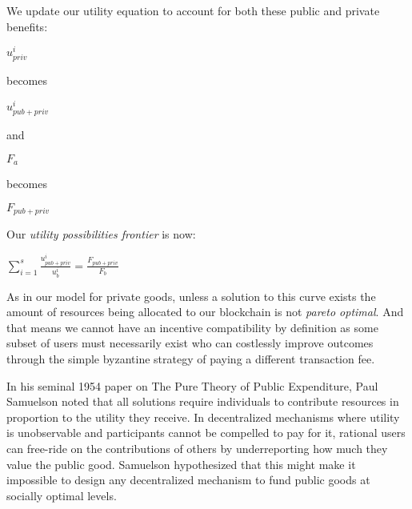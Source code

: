 \documentclass[oneside]{article}   	%
\begin{document}
We update our utility equation to account for both these public and private benefits:

\large
\begin{adjustwidth}{1.5em}{1.5em} 
\begin{math}
{u_{priv}^i}
\end{math}
\end{adjustwidth}
\normalsize

becomes

\large
\begin{adjustwidth}{1.5em}{1.5em} 
\begin{math}
{u_{{pub}+{priv}}^i}
\end{math}
\end{adjustwidth}
\normalsize

and

\large
\begin{adjustwidth}{1.5em}{1.5em} 
\begin{math}
{F_a}
\end{math}
\end{adjustwidth}
\normalsize

becomes

\large
\begin{adjustwidth}{1.5em}{1.5em} 
\begin{math}
{F_{{pub}+{priv}}}
\end{math}
\end{adjustwidth}
\normalsize

Our \textit{utility possibilities frontier} is now:

\LARGE
\begin{adjustwidth}{1.5em}{1.5em} 
\begin{math}
\sum_{i=1}^{s} \frac{u_{{pub}+{priv}}^i}{u_b^i} = \frac{F_{{pub}+{priv}}}{F_b}
\end{math}
\end{adjustwidth}
\normalsize

As in our model for private goods, unless a solution to this curve exists the amount of resources being allocated to our blockchain is not \textit{pareto optimal}. And that means we cannot have an incentive compatibility by definition as some subset of users must necessarily exist who can costlessly improve outcomes through the simple byzantine strategy of paying a different transaction fee.

In his seminal 1954 paper on The Pure Theory of Public Expenditure, Paul Samuelson noted that all solutions require individuals to contribute resources in proportion to the utility they receive. In decentralized mechanisms where utility is unobservable and participants cannot be compelled to pay for it, rational users can free-ride on the contributions of others by underreporting how much they value the public good. Samuelson hypothesized that this might make it impossible to design any decentralized mechanism to fund public goods at socially optimal levels.
\end{document}
